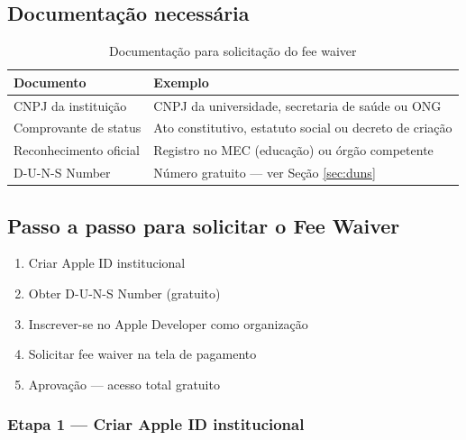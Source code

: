 \documentclass[12pt, a4paper]{article}
\begin{document}
\subsection{Documenta\c{c}\~ao necess\'aria}

\begin{table}[H]
\centering
\renewcommand{\arraystretch}{1.4}
\begin{tabularx}{\textwidth}{|l|X|}
\hline
\rowcolor{verdeE}
\textbf{\color{white}Documento} & \textbf{\color{white}Exemplo} \\
\hline
CNPJ da institui\c{c}\~ao & CNPJ da universidade, secretaria de sa\'ude ou ONG \\
\hline
\rowcolor{cinzaC}
Comprovante de status & Ato constitutivo, estatuto social ou decreto de cria\c{c}\~ao \\
\hline
Reconhecimento oficial & Registro no MEC (educa\c{c}\~ao) ou \'org\~ao competente \\
\hline
\rowcolor{cinzaC}
D-U-N-S Number & N\'umero gratuito --- ver Se\c{c}\~ao \ref{sec:duns} \\
\hline
\end{tabularx}
\caption{Documenta\c{c}\~ao para solicita\c{c}\~ao do fee waiver}
\end{table}

\subsection{Passo a passo para solicitar o Fee Waiver}

\begin{caixadestaque}
\begin{enumerate}[label=\textbf{\color{verde}Etapa \arabic*:}, leftmargin=2.5cm]
  \item Criar Apple ID institucional
  \item Obter D-U-N-S Number (gratuito)
  \item Inscrever-se no Apple Developer como organiza\c{c}\~ao
  \item Solicitar fee waiver na tela de pagamento
  \item Aprova\c{c}\~ao --- acesso total gratuito
\end{enumerate}
\end{caixadestaque}

\subsubsection{Etapa 1 --- Criar Apple ID institucional}
\end{document}
